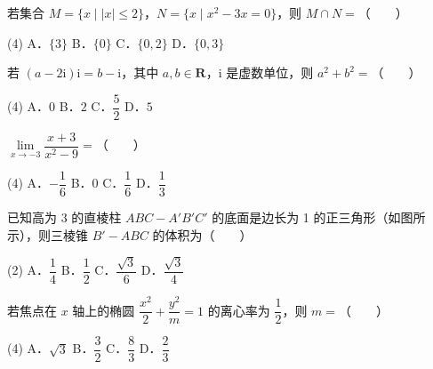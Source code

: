 

\begin{question}
若集合 $M = \{x \mid |x| \leqslant 2\}$，$N = \{x \mid x^2 - 3x = 0\}$，则 $M \cap N =$\mbox{（　　）}

\begin{gkopts}(4)
\task A．$\{3\}$
\task B．$\{0\}$
\task C．$\{0, 2\}$
\task D．$\{0, 3\}$
\end{gkopts}

\end{question}
\begin{question}
若 $(a - 2\mathrm{i})\mathrm{i} = b - \mathrm{i}$，其中 $a, b \in \mathbf{R}$，$\mathrm{i}$ 是虚数单位，则 $a^2 + b^2 =$\mbox{（　　）}

\begin{gkopts}(4)
\task A．$0$
\task B．$2$
\task C．$\dfrac{5}{2}$
\task D．$5$
\end{gkopts}

\end{question}
\begin{question}
$\lim\limits_{x\to-3} \dfrac{x + 3}{x^2 - 9} =$\mbox{（　　）}

\begin{gkopts}(4)
\task A．$-\dfrac{1}{6}$
\task B．$0$
\task C．$\dfrac{1}{6}$
\task D．$\dfrac{1}{3}$
\end{gkopts}

\Needspace{0.4\textheight}
\end{question}
\begin{question}
已知高为 3 的直棱柱 $ABC - A'B'C'$ 的底面是边长为 1 的正三角形（如图所示），则三棱锥 $B' - ABC$ 的体积为\mbox{（　　）}
\nopagebreak[4]
\begin{center}\end{center}
\nopagebreak[4]
\begin{gkopts}(2)
\task A．$\dfrac{1}{4}$
\task B．$\dfrac{1}{2}$
\task C．$\dfrac{\sqrt{3}}{6}$
\task D．$\dfrac{\sqrt{3}}{4}$
\end{gkopts}

\end{question}
\begin{question}
若焦点在 $x$ 轴上的椭圆 $\dfrac{x^2}{2} + \dfrac{y^2}{m} = 1$ 的离心率为 $\dfrac{1}{2}$，则 $m =$\mbox{（　　）}

\begin{gkopts}(4)
\task A．$\sqrt{3}$
\task B．$\dfrac{3}{2}$
\task C．$\dfrac{8}{3}$
\task D．$\dfrac{2}{3}$
\end{gkopts}

\end{question}
